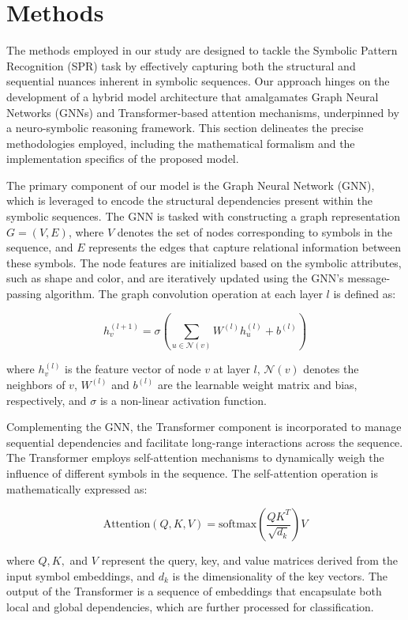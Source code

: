 \documentclass{article}
\begin{document}
\section{Methods}
The methods employed in our study are designed to tackle the Symbolic Pattern Recognition (SPR) task by effectively capturing both the structural and sequential nuances inherent in symbolic sequences. Our approach hinges on the development of a hybrid model architecture that amalgamates Graph Neural Networks (GNNs) and Transformer-based attention mechanisms, underpinned by a neuro-symbolic reasoning framework. This section delineates the precise methodologies employed, including the mathematical formalism and the implementation specifics of the proposed model.

The primary component of our model is the Graph Neural Network (GNN), which is leveraged to encode the structural dependencies present within the symbolic sequences. The GNN is tasked with constructing a graph representation \( G = (V, E) \), where \( V \) denotes the set of nodes corresponding to symbols in the sequence, and \( E \) represents the edges that capture relational information between these symbols. The node features are initialized based on the symbolic attributes, such as shape and color, and are iteratively updated using the GNN’s message-passing algorithm. The graph convolution operation at each layer \( l \) is defined as:

\[
h_v^{(l+1)} = \sigma \left( \sum_{u \in \mathcal{N}(v)} W^{(l)} h_u^{(l)} + b^{(l)} \right)
\]

where \( h_v^{(l)} \) is the feature vector of node \( v \) at layer \( l \), \( \mathcal{N}(v) \) denotes the neighbors of \( v \), \( W^{(l)} \) and \( b^{(l)} \) are the learnable weight matrix and bias, respectively, and \( \sigma \) is a non-linear activation function.

Complementing the GNN, the Transformer component is incorporated to manage sequential dependencies and facilitate long-range interactions across the sequence. The Transformer employs self-attention mechanisms to dynamically weigh the influence of different symbols in the sequence. The self-attention operation is mathematically expressed as:

\[
\text{Attention}(Q, K, V) = \text{softmax} \left(\frac{QK^T}{\sqrt{d_k}} \right) V
\]

where \( Q, K, \) and \( V \) represent the query, key, and value matrices derived from the input symbol embeddings, and \( d_k \) is the dimensionality of the key vectors. The output of the Transformer is a sequence of embeddings that encapsulate both local and global dependencies, which are further processed for classification.
\end{document}
